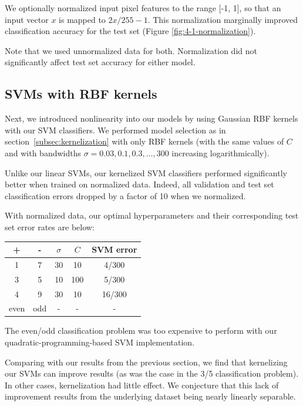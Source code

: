 \documentclass{article}
\begin{document}
\begin{multicols}{2}
We optionally normalized input pixel features to the range [-1, 1], so that an input vector $x$ is mapped to $2x/255-1$. This normalization marginally improved classification accuracy for the test set (Figure \ref{fig:4-1-normalization}).

Note that we used unnormalized data for both.
Normalization did not significantly affect test set accuracy
for either model.



\subsection{SVMs with RBF kernels}

Next, we introduced nonlinearity into our models
by using Gaussian RBF kernels with our SVM classifiers.
We performed model selection as in section~\ref{subsec:kernelization}
with only RBF kernels
(with the same values of $C$
and with bandwidths $\sigma = 0.03,0.1,0.3,\dots,300$ increasing logarithmically).

Unlike our linear SVMs,
our kernelized SVM classifiers performed significantly better
when trained on normalized data.
Indeed, all validation and test set classification errors dropped by a factor of 10
when we normalized.

With normalized data, our optimal hyperparameters
and their corresponding test set error rates are below:
\begin{center}
\begin{tabular}{|c|c|c|c|c|}
\hline
+ & - & $\sigma$ & $C$ & SVM error \\\hline
1 & 7 &30 & 10 & 4/300 \\
3 & 5 &10 & 100 & 5/300\\
4 & 9 & 30 & 10 & 16/300\\
even & odd & - & - & - \\\hline
\end{tabular}
\end{center}
The even/odd classification problem was
too expensive to perform
with our quadratic-programming-based SVM implementation.

Comparing with our results from the previous section,
we find that kernelizing our SVMs can improve results
(as was the case in the 3/5 classification problem).
In other cases, kernelization had little effect.
We conjecture that this lack of improvement results from
the underlying dataset being nearly linearly separable.



\end{multicols}
\end{document}
